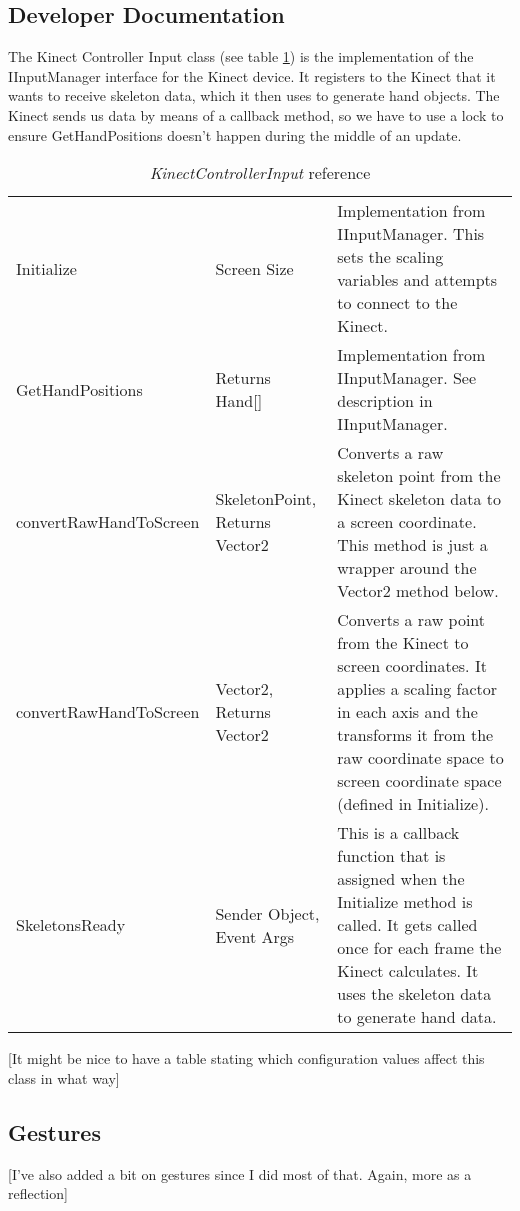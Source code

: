 \clearpage{}
\subsection{Developer Documentation}
The Kinect Controller Input class (see table \ref{KinectInputRef}) is the implementation of the IInputManager interface for the Kinect device. It registers to the Kinect that it wants to receive skeleton data, which it then uses to generate hand objects. The Kinect sends us data by means of a callback method, so we have to use a lock to ensure GetHandPositions doesn't happen during the middle of an update.

\begin{table}[h]
\begin{tabular}{|>{\raggedright}p{5cm}|>{\raggedright}p{3.6cm}|>{\raggedright}p{7cm}|}
\hline 
\multicolumn{3}{|c|}{KinectControllerInput}\tabularnewline
\hline 
Initialize & Screen Size & Implementation from IInputManager. This sets the scaling variables
and attempts to connect to the Kinect.\tabularnewline
\hline 
GetHandPositions & Returns Hand{[}{]} & Implementation from IInputManager. See description in IInputManager.\tabularnewline
\hline 
convertRawHandToScreen & SkeletonPoint, Returns Vector2 & Converts a raw skeleton point from the Kinect skeleton data to a screen
coordinate. This method is just a wrapper around the Vector2 method
below.\tabularnewline
\hline 
convertRawHandToScreen & Vector2, Returns Vector2 & Converts a raw point from the Kinect to screen coordinates. It applies
a scaling factor in each axis and the transforms it from the raw coordinate
space to screen coordinate space (defined in Initialize).\tabularnewline
\hline 
SkeletonsReady & Sender Object, Event Args & This is a callback function that is assigned when the Initialize method
is called. It gets called once for each frame the Kinect calculates.
It uses the skeleton data to generate hand data.\tabularnewline
\hline 
\end{tabular}

\caption{\emph{KinectControllerInput} reference}

\label{KinectInputRef}
\end{table}

[It might be nice to have a table stating which configuration values affect this class in what way]

\clearpage{}
\subsection{Gestures}
[I've also added a bit on gestures since I did most of that. Again, more as a reflection]

